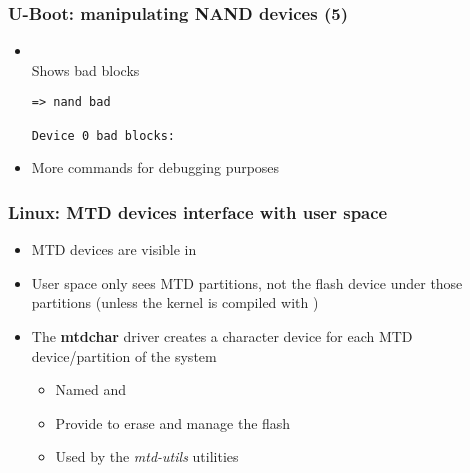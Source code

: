 \begin{frame}[fragile]
  \frametitle{U-Boot: manipulating NAND devices (5)}
  \begin{itemize}
  \item {}\\
    Shows bad blocks
    \begin{block}{}
    \footnotesize
    \begin{verbatim}
=> nand bad

Device 0 bad blocks:
    \end{verbatim}
    \end{block}
  \item More commands for debugging purposes
  \end{itemize}
\end{frame}


\begin{frame}
  \frametitle{Linux: MTD devices interface with user space}
  \begin{itemize}
  \item MTD devices are visible in 
  \item User space only sees MTD partitions, not the flash device
    under those partitions (unless the kernel is compiled with
    )
  \item The {\bf mtdchar} driver creates a character device for each
    MTD device/partition of the system
    \begin{itemize}
    \item Named  and 
    \item Provide  to erase and manage the flash
    \item Used by the {\em mtd-utils} utilities
    \end{itemize}
  \end{itemize}
\end{frame}

